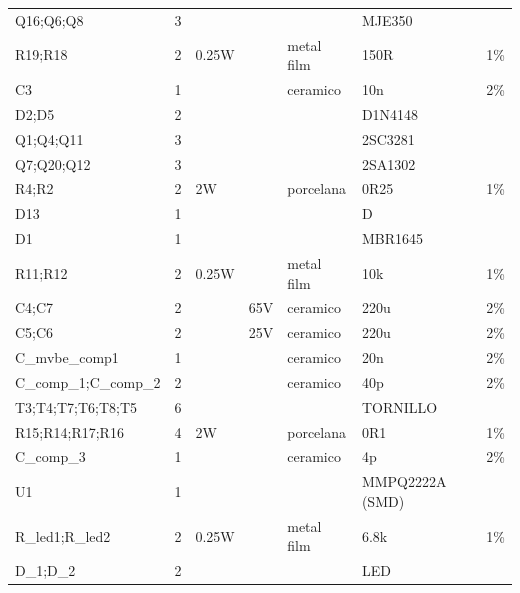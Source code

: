 \documentclass[a4paper,12pt,twoside]{article}
\begin{document}
\begin{table}[h!]
\begin{tabular}{@{}lllllll@{}}
Q16;Q6;Q8             & 3        &           &           &            & MJE350   &     \\
R19;R18               & 2        &  0.25W    &           &  metal film& 150R     & 1\% \\
C3                    & 1        &           &           &  ceramico  & 10n      & 2\% \\
D2;D5                 & 2        &           &           &            & D1N4148  &     \\
Q1;Q4;Q11             & 3        &           &           &            & 2SC3281  &     \\
Q7;Q20;Q12            & 3        &           &           &            & 2SA1302  &     \\
R4;R2                 & 2        &  2W       &           &  porcelana & 0R25     & 1\% \\
D13                   & 1        &           &           &            & D        &     \\
D1                    & 1        &           &           &            & MBR1645  &     \\
R11;R12               & 2        &  0.25W    &           &  metal film& 10k      & 1\% \\
C4;C7                 & 2        &           & 65V       &  ceramico  & 220u     & 2\% \\
C5;C6                 & 2        &           & 25V       &  ceramico  & 220u     & 2\% \\
C\_mvbe\_comp1        & 1        &           &           &  ceramico  & 20n      & 2\% \\
C\_comp\_1;C\_comp\_2 & 2        &           &           &  ceramico  & 40p      & 2\% \\
T3;T4;T7;T6;T8;T5     & 6        &           &           &            & TORNILLO &     \\
R15;R14;R17;R16       & 4        &  2W       &           &  porcelana & 0R1      & 1\% \\
C\_comp\_3            & 1        &           &           &  ceramico  & 4p       & 2\% \\
U1                    & 1        &           &           &            & MMPQ2222A (SMD)& \\
R\_led1;R\_led2       & 2        &  0.25W    &           &  metal film& 6.8k     & 1\% \\
D\_1;D\_2             & 2        &           &           &            & LED      &     \\

\end{tabular}
\end{table}
\end{document}
